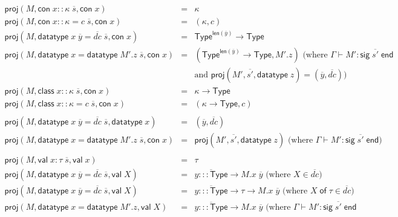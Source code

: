 \documentclass{article}
\newcommand{\mt}[1]{\mathsf{#1}}
\begin{document}
\begin{eqnarray*}
  \mt{proj}(M, \mt{con} \; x :: \kappa \; \overline{s}, \mt{con} \; x) &=& \kappa \\
  \mt{proj}(M, \mt{con} \; x :: \kappa = c \; \overline{s}, \mt{con} \; x) &=& (\kappa, c) \\
  \mt{proj}(M, \mt{datatype} \; x \; \overline{y} = \overline{dc} \; \overline{s}, \mt{con} \; x) &=& \mt{Type}^{\mt{len}(\overline{y})} \to \mt{Type} \\
  \mt{proj}(M, \mt{datatype} \; x = \mt{datatype} \; M'.z \; \overline{s}, \mt{con} \; x) &=& (\mt{Type}^{\mt{len}(\overline{y})} \to \mt{Type}, M'.z) \textrm{ (where $\Gamma \vdash M' : \mt{sig} \; \overline{s'} \; \mt{end}$} \\
  && \textrm{and $\mt{proj}(M', \overline{s'}, \mt{datatype} \; z) = (\overline{y}, \overline{dc})$)} \\
  \mt{proj}(M, \mt{class} \; x :: \kappa \; \overline{s}, \mt{con} \; x) &=& \kappa \to \mt{Type} \\
  \mt{proj}(M, \mt{class} \; x :: \kappa = c \; \overline{s}, \mt{con} \; x) &=& (\kappa \to \mt{Type}, c) \\
  \\
  \mt{proj}(M, \mt{datatype} \; x \; \overline{y} = \overline{dc} \; \overline{s}, \mt{datatype} \; x) &=& (\overline{y}, \overline{dc}) \\
  \mt{proj}(M, \mt{datatype} \; x = \mt{datatype} \; M'.z \; \overline{s}, \mt{con} \; x) &=& \mt{proj}(M', \overline{s'}, \mt{datatype} \; z) \textrm{ (where $\Gamma \vdash M' : \mt{sig} \; \overline{s'} \; \mt{end}$)} \\
  \\
  \mt{proj}(M, \mt{val} \; x : \tau \; \overline{s}, \mt{val} \; x) &=& \tau \\
  \mt{proj}(M, \mt{datatype} \; x \; \overline{y} = \overline{dc} \; \overline{s}, \mt{val} \; X) &=& \overline{y ::: \mt{Type}} \to M.x \; \overline y \textrm{ (where $X \in \overline{dc}$)} \\
  \mt{proj}(M, \mt{datatype} \; x \; \overline{y} = \overline{dc} \; \overline{s}, \mt{val} \; X) &=& \overline{y ::: \mt{Type}} \to \tau \to M.x \; \overline y \textrm{ (where $X \; \mt{of} \; \tau \in \overline{dc}$)} \\
  \mt{proj}(M, \mt{datatype} \; x = \mt{datatype} \; M'.z, \mt{val} \; X) &=& \overline{y ::: \mt{Type}} \to M.x \; \overline y \textrm{ (where $\Gamma \vdash M' : \mt{sig} \; \overline{s'} \; \mt{end}$} \\

\end{eqnarray*}
\end{document}
